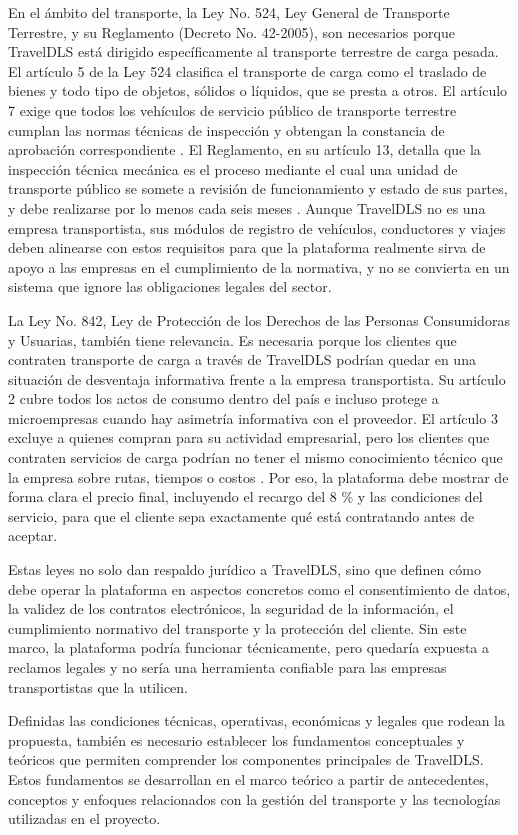 En el ámbito del transporte, la Ley No. 524, Ley General de Transporte Terrestre, y su Reglamento (Decreto No. 42-2005), son necesarios porque TravelDLS está dirigido específicamente al transporte terrestre de carga pesada. El artículo 5 de la Ley 524 clasifica el transporte de carga como el traslado de bienes y todo tipo de objetos, sólidos o líquidos, que se presta a otros. El artículo 7 exige que todos los vehículos de servicio público de transporte terrestre cumplan las normas técnicas de inspección y obtengan la constancia de aprobación correspondiente \parencite[Arts. 5 y 7]{ley524_2005}. El Reglamento, en su artículo 13, detalla que la inspección técnica mecánica es el proceso mediante el cual una unidad de transporte público se somete a revisión de funcionamiento y estado de sus partes, y debe realizarse por lo menos cada seis meses \parencite[Art.13]{decreto42_2005}. Aunque TravelDLS no es una empresa transportista, sus módulos de registro de vehículos, conductores y viajes deben alinearse con estos requisitos para que la plataforma realmente sirva de apoyo a las empresas en el cumplimiento de la normativa, y no se convierta en un sistema que ignore las obligaciones legales del sector.

La Ley No. 842, Ley de Protección de los Derechos de las Personas Consumidoras y Usuarias, también tiene relevancia. Es necesaria porque los clientes que contraten transporte de carga a través de TravelDLS podrían quedar en una situación de desventaja informativa frente a la empresa transportista. Su artículo 2 cubre todos los actos de consumo dentro del país e incluso protege a microempresas cuando hay asimetría informativa con el proveedor. El artículo 3 excluye a quienes compran para su actividad empresarial, pero los clientes que contraten servicios de carga podrían no tener el mismo conocimiento técnico que la empresa sobre rutas, tiempos o costos \parencite[Arts. 2--3]{ley842_2013}. Por eso, la plataforma debe mostrar de forma clara el precio final, incluyendo el recargo del 8 \% y las condiciones del servicio, para que el cliente sepa exactamente qué está contratando antes de aceptar.

Estas leyes no solo dan respaldo jurídico a TravelDLS, sino que definen cómo debe operar la plataforma en aspectos concretos como el consentimiento de datos, la validez de los contratos electrónicos, la seguridad de la información, el cumplimiento normativo del transporte y la protección del cliente. Sin este marco, la plataforma podría funcionar técnicamente, pero quedaría expuesta a reclamos legales y no sería una herramienta confiable para las empresas transportistas que la utilicen.

Definidas las condiciones técnicas, operativas, económicas y legales que rodean la propuesta, también es necesario establecer los fundamentos conceptuales y teóricos que permiten comprender los componentes principales de TravelDLS. Estos fundamentos se desarrollan en el marco teórico a partir de antecedentes, conceptos y enfoques relacionados con la gestión del transporte y las tecnologías utilizadas en el proyecto.
